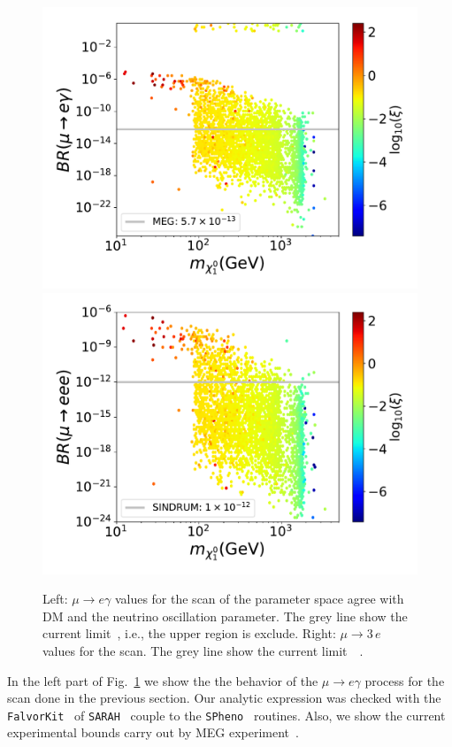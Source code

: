 \documentclass[12pt,letterpaper]{article}
\begin{document}
\begin{figure}
\begin{center}
\includegraphics[scale=0.43]{ueg_with_neutrino_physics}
\includegraphics[scale=0.43]{u3e_with_neutrino_physics}
\caption{Left: $\mu\rightarrow e\gamma$ values for the scan of the parameter space agree with DM and the neutrino oscillation parameter. The grey line show the current limit~\cite{Adam:2013mnn}, i.e., the upper region is exclude.
Right: $\mu\rightarrow 3\,e$ values for the scan. The grey line show the current limit~~\cite{Bertl:1985mw}.}
\label{fig:ueg-e3e}
\end{center}
\end{figure}
%
In the left part of Fig.~\ref{fig:ueg-e3e} we show the the behavior of the $\mu\rightarrow e\gamma$ process for the scan done in the previous section. Our analytic expression was checked with the \texttt{FalvorKit}~\cite{Porod:2014xia} of \texttt{SARAH}~\cite{Staub:2008uz,Staub:2009bi,Staub:2010jh,Staub:2012pb,Staub:2013tta} couple to the \texttt{SPheno}~\cite{Porod:2003um,Porod:2011nf} routines. Also, we show the current experimental bounds carry out by MEG experiment~\cite{Adam:2013mnn}. 
\end{document}
